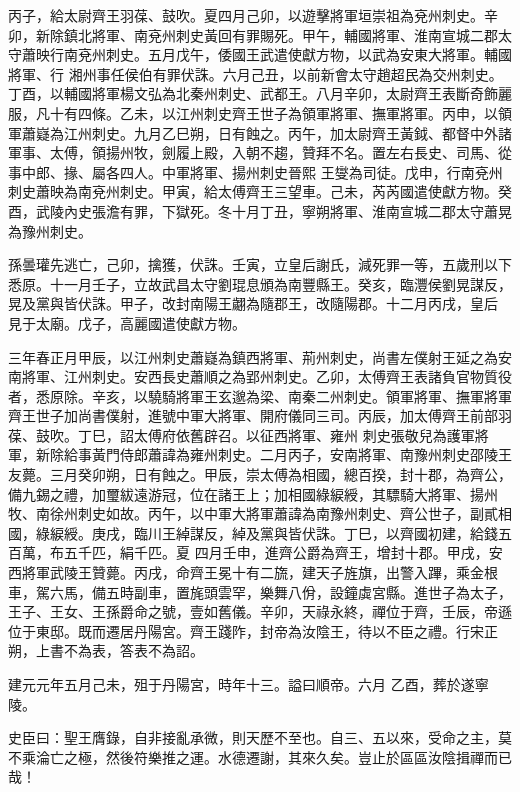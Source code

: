 \begin{pinyinscope}
 丙子，給太尉齊王羽葆、鼓吹。夏四月己卯，以遊擊將軍垣崇祖為兗州刺史。辛卯，新除鎮北將軍、南兗州刺史黃回有罪賜死。甲午，輔國將軍、淮南宣城二郡太守蕭映行南兗州刺史。五月戊午，倭國王武遣使獻方物，以武為安東大將軍。輔國將軍、行
 湘州事任侯伯有罪伏誅。六月己丑，以前新會太守趙超民為交州刺史。丁酉，以輔國將軍楊文弘為北秦州刺史、武都王。八月辛卯，太尉齊王表斷奇飾麗服，凡十有四條。乙未，以江州刺史齊王世子為領軍將軍、撫軍將軍。丙申，以領軍蕭嶷為江州刺史。九月乙巳朔，日有蝕之。丙午，加太尉齊王黃鉞、都督中外諸軍事、太傅，領揚州牧，劍履上殿，入朝不趨，贊拜不名。置左右長史、司馬、從事中郎、掾、屬各四人。中軍將軍、揚州刺史晉熙
 王燮為司徒。戊申，行南兗州刺史蕭映為南兗州刺史。甲寅，給太傅齊王三望車。己未，芮芮國遣使獻方物。癸酉，武陵內史張澹有罪，下獄死。冬十月丁丑，寧朔將軍、淮南宣城二郡太守蕭晃為豫州刺史。



 孫曇瓘先逃亡，己卯，擒獲，伏誅。壬寅，立皇后謝氏，減死罪一等，五歲刑以下悉原。十一月壬子，立故武昌太守劉琨息頒為南豐縣王。癸亥，臨灃侯劉晃謀反，晃及黨與皆伏誅。甲子，改封南陽王翽為隨郡王，改隨陽郡。十二月丙戌，皇后
 見于太廟。戊子，高麗國遣使獻方物。



 三年春正月甲辰，以江州刺史蕭嶷為鎮西將軍、荊州刺史，尚書左僕射王延之為安南將軍、江州刺史。安西長史蕭順之為郢州刺史。乙卯，太傅齊王表諸負官物質役者，悉原除。辛亥，以驍騎將軍王玄邈為梁、南秦二州刺史。領軍將軍、撫軍將軍齊王世子加尚書僕射，進號中軍大將軍、開府儀同三司。丙辰，加太傅齊王前部羽葆、鼓吹。丁巳，詔太傅府依舊辟召。以征西將軍、雍州
 刺史張敬兒為護軍將軍，新除給事黃門侍郎蕭諱為雍州刺史。二月丙子，安南將軍、南豫州刺史邵陵王友薨。三月癸卯朔，日有蝕之。甲辰，崇太傅為相國，總百揆，封十郡，為齊公，備九錫之禮，加璽紱遠游冠，位在諸王上；加相國綠綟綬，其驃騎大將軍、揚州牧、南徐州刺史如故。丙午，以中軍大將軍蕭諱為南豫州刺史、齊公世子，副貳相國，綠綟綬。庚戌，臨川王綽謀反，綽及黨與皆伏誅。丁巳，以齊國初建，給錢五百萬，布五千匹，絹千匹。夏
 四月壬申，進齊公爵為齊王，增封十郡。甲戌，安西將軍武陵王贊薨。丙戌，命齊王冕十有二旒，建天子旌旗，出警入蹕，乘金根車，駕六馬，備五時副車，置旄頭雲罕，樂舞八佾，設鐘虡宮縣。進世子為太子，王子、王女、王孫爵命之號，壹如舊儀。辛卯，天祿永終，禪位于齊，壬辰，帝遜位于東邸。既而遷居丹陽宮。齊王踐阼，封帝為汝陰王，待以不臣之禮。行宋正朔，上書不為表，答表不為詔。



 建元元年五月己未，殂于丹陽宮，時年十三。謚曰順帝。六月
 乙酉，葬於遂寧陵。



 史臣曰：聖王膺錄，自非接亂承微，則天歷不至也。自三、五以來，受命之主，莫不乘淪亡之極，然後符樂推之運。水德遷謝，其來久矣。豈止於區區汝陰揖禪而已哉！



\end{pinyinscope}